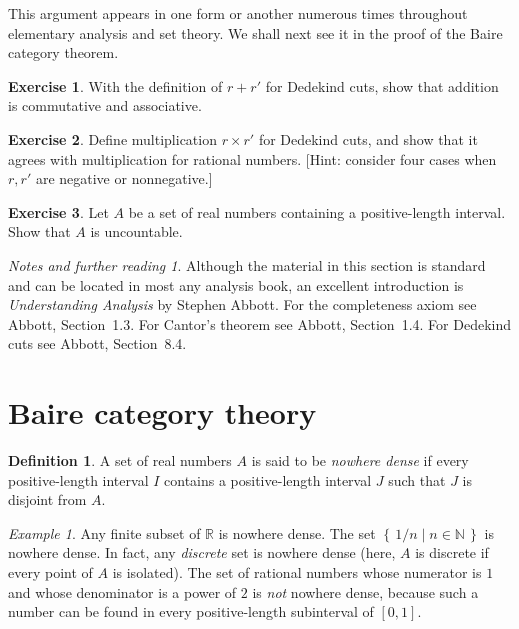 \documentclass[11pt,oneside]{amsbook}
\newcommand{\set}[1]{\left\{\,#1\,\right\}}
\newcommand{\NN}{\mathbb N}
\newcommand{\RR}{\mathbb R}
\theoremstyle{definition}
\newtheorem{exerc}{Exercise}[section]
\theoremstyle{plain}
\theoremstyle{definition}
\newtheorem{defn}[thm]{Definition}
\theoremstyle{remark}
\newtheorem{example}[thm]{Example}
\newtheorem*{notes}{Notes and further reading}
\numberwithin{equation}{section}
\numberwithin{figure}{section}
\begin{document}
This argument appears in one form or another numerous times throughout elementary analysis and set theory. We shall next see it in the proof of the Baire category theorem.

\begin{exerc}
  With the definition of $r+r'$ for Dedekind cuts, show that addition is commutative and associative.
\end{exerc}

\begin{exerc}
  Define multiplication $r\times r'$ for Dedekind cuts, and show that it agrees with multiplication for rational numbers. [Hint: consider four cases when $r,r'$ are negative or nonnegative.]
\end{exerc}

\begin{exerc}
  Let $A$ be a set of real numbers containing a positive-length interval. Show that $A$ is uncountable.
\end{exerc}

\begin{notes}
  Although the material in this section is standard and can be located in most any analysis book, an excellent introduction is \emph{Understanding Analysis} by Stephen Abbott. For the completeness axiom see Abbott, Section~1.3. For Cantor's theorem see Abbott, Section~1.4. For Dedekind cuts see Abbott, Section~8.4.
\end{notes}

\section{Baire category theory}

\begin{defn}
  A set of real numbers $A$ is said to be \emph{nowhere dense} if every positive-length interval $I$ contains a positive-length interval $J$ such that $J$ is disjoint from $A$.
\end{defn}

\begin{example}
  Any finite subset of $\RR$ is nowhere dense. The set $\set{1/n\mid n\in\NN}$ is nowhere dense. In fact, any \emph{discrete} set is nowhere dense (here, $A$ is discrete if every point of $A$ is isolated). The set of rational numbers whose numerator is $1$ and whose denominator is a power of $2$ is \emph{not} nowhere dense, because such a number can be found in every positive-length subinterval of $[0,1]$.
\end{example}
\end{document}
